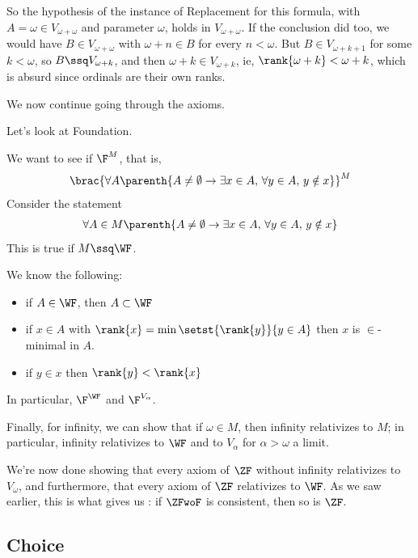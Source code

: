 \begin{boxnexample}
    So the hypothesis of the instance of Replacement for this formula, with $A = \omega \in V_{\omega + \omega}$ and parameter $\omega$, holds in $V_{\omega + \omega}$. If the conclusion did too, we would have $B \in V_{\omega + \omega}$ with $\omega + n \in B$ for every $n < \omega$. But $B \in V_{\omega + k + 1}$ for some $k < \omega$, so $B \ssq V_{\omega + k}$, and then $\omega + k \in V_{\omega + k}$, ie, $\rank{\omega + k} < \omega + k$, which is absurd since ordinals are their own ranks.
\end{boxnexample}

We now continue going through the axioms.

Let's look at Foundation.

We want to see if $\F^M$, that is,
\begin{align*}
    \brac{\forall A \parenth{A \ne \emptyset \to \exists x \in A, \, \forall y \in A, \, y \notin x}}^M
\end{align*}
Consider the statement
\begin{align*}
    \forall A \in M \parenth{A \ne \emptyset \to \exists x \in A, \, \forall y \in A, \, y \notin x}
\end{align*}
This is true if $M \ssq \WF$.

We know the following:
\begin{itemize}
    \item if $A \in \WF$, then $A \subset \WF$
    \item if $x \in A$ with $\rank{x} = \min\setst{\rank{y}}{y \in A}$ then $x$ is $\in$-minimal in $A$.
    \item if $y \in x$ then $\rank{y} < \rank{x}$
\end{itemize}
In particular, $\F^{\WF}$ and $\F^{V_{\alpha}}$.

Finally, for infinity, we can show that if $\omega \in M$, then infinity relativizes to $M$; in particular, infinity relativizes to $\WF$ and to $V_{\alpha}$ for $\alpha > \omega$ a limit.

We're now done showing that every axiom of $\ZF$ without infinity relativizes to $V_{\omega}$, and furthermore, that every axiom of $\ZF$ relativizes to $\WF$. As we saw earlier, this is what gives us : if $\ZFwoF$ is consistent, then so is $\ZF$.

\subsection{Choice}

